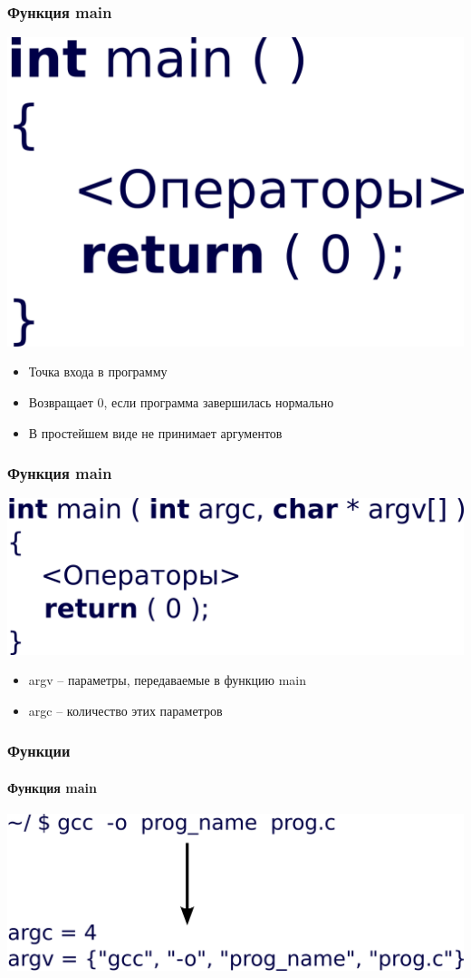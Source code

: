\documentclass[14pt,pdf,hyperref={unicode}]{beamer}
\begin{document}
\begin{frame}[fragile]
\frametitle{Функция main} 
\begin{center}
\includegraphics[width=0.35\linewidth]{images/function_syntax_main.png}
\end{center}
\begin{itemize}
\item Точка входа в программу
\item Возвращает 0, если программа завершилась нормально
\item В простейшем виде не принимает аргументов
\end{itemize}
\end{frame}


\begin{frame}[fragile]
\frametitle{Функция main}  
\begin{center}
\includegraphics[width=0.7\linewidth]{images/function_syntax_main_args.png}
\end{center}
\begin{itemize}
\item argv -- параметры, передаваемые в функцию main
\item argc -- количество этих параметров
\end{itemize}
\end{frame}

\begin{frame}[fragile]
\frametitle{Функции} 
\framesubtitle{Функция main}
\begin{center}
\includegraphics[width=1.0\linewidth]{images/function_argcargv.png}
\end{center}
\end{frame}
\end{document}
